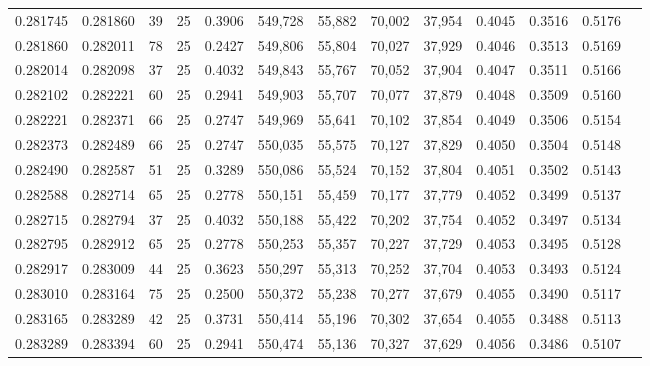 \begin{tabular}{rrrrrrrrrrrrr}
0.281745 & 0.281860 &    39 &  25 &                                     0.3906 & 549,728 &  55,882 &  70,002 &  37,954 & 0.4045 & 0.3516 & 0.5176 \\
0.281860 & 0.282011 &    78 &  25 &                                     0.2427 & 549,806 &  55,804 &  70,027 &  37,929 & 0.4046 & 0.3513 & 0.5169 \\
0.282014 & 0.282098 &    37 &  25 &                                     0.4032 & 549,843 &  55,767 &  70,052 &  37,904 & 0.4047 & 0.3511 & 0.5166 \\
0.282102 & 0.282221 &    60 &  25 &                                     0.2941 & 549,903 &  55,707 &  70,077 &  37,879 & 0.4048 & 0.3509 & 0.5160 \\
0.282221 & 0.282371 &    66 &  25 &                                     0.2747 & 549,969 &  55,641 &  70,102 &  37,854 & 0.4049 & 0.3506 & 0.5154 \\
0.282373 & 0.282489 &    66 &  25 &                                     0.2747 & 550,035 &  55,575 &  70,127 &  37,829 & 0.4050 & 0.3504 & 0.5148 \\
0.282490 & 0.282587 &    51 &  25 &                                     0.3289 & 550,086 &  55,524 &  70,152 &  37,804 & 0.4051 & 0.3502 & 0.5143 \\
0.282588 & 0.282714 &    65 &  25 &                                     0.2778 & 550,151 &  55,459 &  70,177 &  37,779 & 0.4052 & 0.3499 & 0.5137 \\
0.282715 & 0.282794 &    37 &  25 &                                     0.4032 & 550,188 &  55,422 &  70,202 &  37,754 & 0.4052 & 0.3497 & 0.5134 \\
0.282795 & 0.282912 &    65 &  25 &                                     0.2778 & 550,253 &  55,357 &  70,227 &  37,729 & 0.4053 & 0.3495 & 0.5128 \\
0.282917 & 0.283009 &    44 &  25 &                                     0.3623 & 550,297 &  55,313 &  70,252 &  37,704 & 0.4053 & 0.3493 & 0.5124 \\
0.283010 & 0.283164 &    75 &  25 &                                     0.2500 & 550,372 &  55,238 &  70,277 &  37,679 & 0.4055 & 0.3490 & 0.5117 \\
0.283165 & 0.283289 &    42 &  25 &                                     0.3731 & 550,414 &  55,196 &  70,302 &  37,654 & 0.4055 & 0.3488 & 0.5113 \\
0.283289 & 0.283394 &    60 &  25 &                                     0.2941 & 550,474 &  55,136 &  70,327 &  37,629 & 0.4056 & 0.3486 & 0.5107 \\

\end{tabular}
